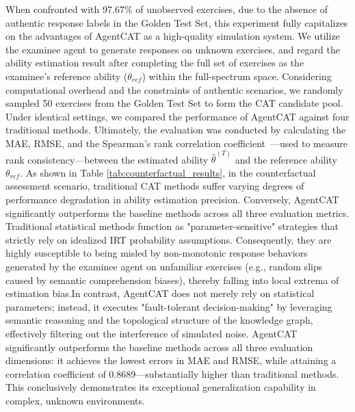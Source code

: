 

When confronted with 97.67\% of unobserved exercises, due to the absence of authentic response labels in the Golden Test Set, this experiment fully capitalizes on the advantages of AgentCAT as a high-quality simulation system. We utilize the examinee agent to generate responses on unknown exercises, and regard the ability estimation result after completing the full set of exercises as the examinee's reference ability ($\theta_{ref}$) within the full-spectrum space. Considering computational overhead and the constraints of authentic scenarios, we randomly sampled 50 exercises from the Golden Test Set to form the CAT candidate pool. Under identical settings, we compared the performance of AgentCAT against four traditional methods. Ultimately, the evaluation was conducted by calculating the MAE, RMSE, and the Spearman's rank correlation coefficient~\cite{liu2024computerized}—used to measure rank consistency—between the estimated ability $\hat{\theta}^{(T)}$ and the reference ability $\theta_{ref}$. As shown in Table \ref{tab:counterfactual_results}, in the counterfactual assessment scenario, traditional CAT methods suffer varying degrees of performance degradation in ability estimation precision. Conversely, AgentCAT significantly outperforms the baseline methods across all three evaluation metrics. Traditional statistical methods function as "parameter-sensitive" strategies that strictly rely on idealized IRT  probability assumptions. Consequently, they are highly susceptible to being misled by non-monotonic response behaviors generated by the examinee agent on unfamiliar exercises (e.g., random slips caused by semantic comprehension biases), thereby falling into local extrema of estimation bias.In contrast, AgentCAT does not merely rely on statistical parameters; instead, it executes "fault-tolerant decision-making" by leveraging semantic reasoning and the topological structure of the knowledge graph, effectively filtering out the interference of simulated noise. AgentCAT significantly outperforms the baseline methods across all three evaluation dimensions: it achieves the lowest errors in MAE and RMSE, while attaining a correlation coefficient of 0.8689—substantially higher than traditional methods. This conclusively demonstrates its exceptional generalization capability in complex, unknown environments.


